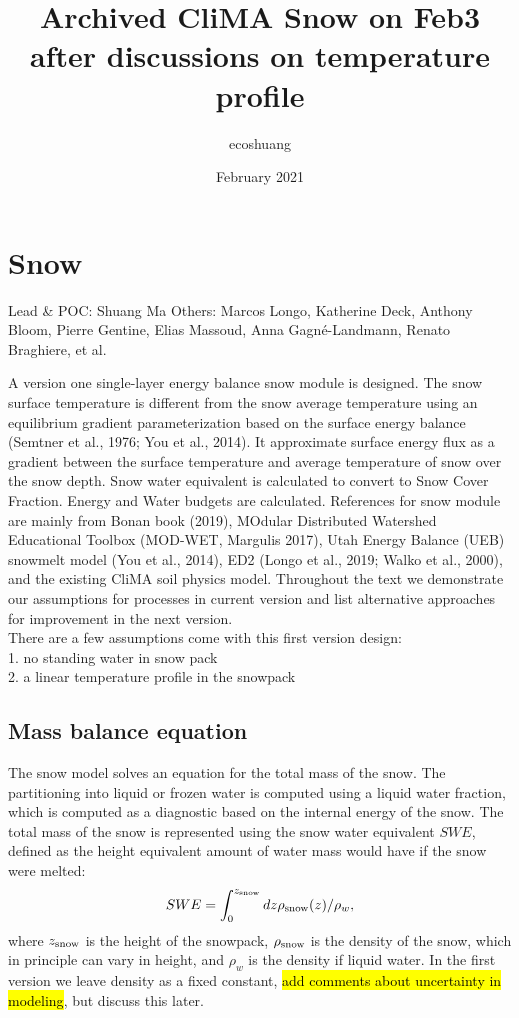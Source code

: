 \documentclass{article}
\title{Archived CliMA Snow on Feb3 after discussions on temperature profile}
\author{ecoshuang }
\date{February  2021}
\begin{document}
\maketitle

\chapter{Snow}
Lead & POC: Shuang Ma
Others: Marcos Longo, Katherine Deck, Anthony Bloom, Pierre Gentine, Elias Massoud, Anna Gagné-Landmann, Renato Braghiere, et al.

A  version one single-layer energy balance snow module is designed. The snow surface temperature is different from the snow average temperature using an equilibrium gradient parameterization based on the surface energy balance (Semtner et al., 1976; You et al., 2014). It approximate surface energy flux as a gradient between the surface temperature and average temperature of snow over the snow depth. Snow water equivalent is calculated to convert to Snow Cover Fraction. Energy and Water budgets are calculated. References for snow module are mainly from Bonan book (2019), MOdular Distributed Watershed Educational Toolbox (MOD-WET, Margulis 2017),  Utah Energy Balance (UEB) snowmelt model (You et al., 2014), ED2 (Longo et al., 2019; Walko et al., 2000), and the existing CliMA soil physics model. Throughout the text we demonstrate our assumptions for processes in current version and list alternative approaches for improvement in the next version.\\
There are a few assumptions come with this first version design:\\
1. no standing water in snow pack\\
2. a linear temperature profile in the snowpack\\


\section{Mass balance equation }
The snow model solves an equation for the total mass of the snow. The partitioning into liquid or frozen water is computed using a liquid water fraction, which is computed as a diagnostic based on the internal energy of the snow. The total mass of the snow is represented using the snow water equivalent $SWE$, defined as the height equivalent amount of water mass would have if the snow were melted:
\begin{equation}
    SWE =\int_0^{z_{\rm snow}} dz \rho_{\rm snow}(z)/\rho_w,
\end{equation}
where $z_{\rm snow}$ is the height of the snowpack, $\rho_{\rm snow}$ is the density of the snow, which in principle can vary in height, and $\rho_w$ is the density if liquid water. In the first version we leave density as a fixed constant, \hl{add comments about uncertainty in modeling}, but discuss this later.
\end{document}
